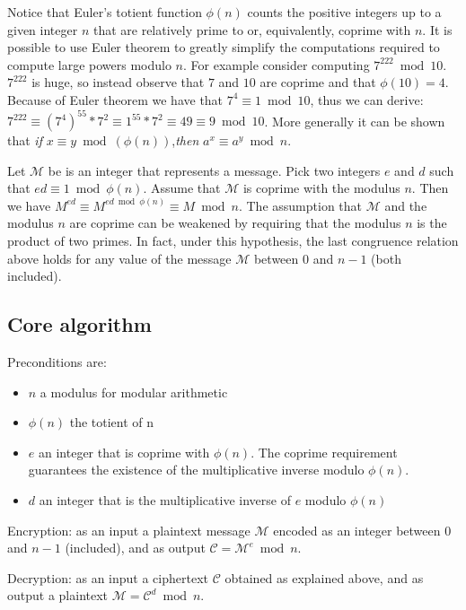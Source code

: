 Notice that Euler's totient function  $\phi(n)$ counts the positive integers up to a given integer $n$ that are relatively prime to or, equivalently, coprime with $n$. It is possible to use Euler theorem to greatly simplify the computations required to compute large powers modulo $n$. For example consider computing $7^{222} \bmod 10$. $7^{222}$ is huge, so instead observe that $7$ and $10$ are coprime and that $\phi(10) = 4$. Because of Euler theorem we have that $7^4 \equiv 1 \bmod 10$, thus we can derive: $7^{222} \equiv (7^4)^{55} * 7^2 \equiv 1^{55} * 7^2 \equiv 49 \equiv 9 \bmod 10$.
More generally it can be shown that \emph{if} $x \equiv y \bmod(\phi(n))$,\emph{then} $  a^x \equiv a^y \bmod n$.

Let $\mathcal{M}$ be is an integer that represents a message. Pick two integers $e$ and $d$ such that $ed \equiv 1 \bmod \phi(n)$. Assume that $\mathcal{M}$ is coprime with the modulus $n$. Then we have $M^{ed} \equiv M^{ed \bmod \phi(n)} \equiv M  \bmod n$.  The assumption that $\mathcal{M}$ and the modulus $n$ are coprime can be weakened by requiring that the modulus $n$ is the product of two primes. In fact, under this hypothesis, the last congruence relation above holds for any value of the message $\mathcal{M}$ between 0 and $n-1$ (both included).

\subsection{Core algorithm}

Preconditions are:
\begin{itemize}
	\item $n$ a modulus for modular arithmetic
	\item $\phi(n)$ the totient of n
	\item $e$ an integer that is coprime with $\phi(n)$. The coprime requirement guarantees the
	existence of the multiplicative inverse modulo $\phi(n)$.
	\item $d$ an integer that is the multiplicative inverse of $e$ modulo $\phi(n)$
\end{itemize}

Encryption: as an input a plaintext message $\mathcal{M}$ encoded as an integer between 0 and $n-1$ (included), and as output $\mathcal{C} = \mathcal{M}^e \bmod n$. 

Decryption: as an input a ciphertext $\mathcal{C}$ obtained as explained above, and as output a plaintext $\mathcal{M} = \mathcal{C}^d \bmod n$.

